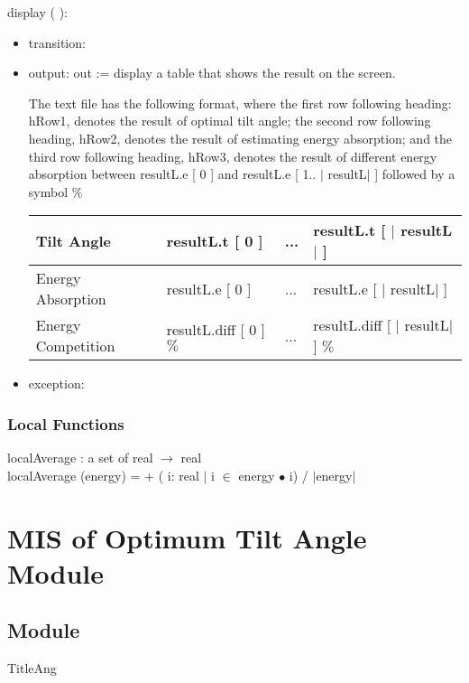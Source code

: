 \documentclass[12pt, titlepage]{article}
\begin{document}
\noindent  display ( ):
\begin{itemize}
\item transition:
\item output: out := display a table that shows the result on the screen.

The text file has the following format, where the first row following heading: hRow1, denotes the result of optimal tilt angle; the second row following heading, hRow2, denotes the result of estimating energy absorption; and the third row following heading, hRow3, denotes the result of different energy absorption between resultL.e [ 0 ] and resultL.e [ 1.. $|$ resultL$|$ ] followed by a symbol $\%$


\begin{center}
\begin{tabular}{p{4.5cm}|p{4cm}|p{1cm}|p{5cm}}

\hline 
Tilt Angle & resultL.t [ 0 ] & ...  & resultL.t [ $|$ resultL$|$ ] \\
\hline 
Energy Absorption & resultL.e [ 0 ] & ...  & resultL.e [ $|$ resultL$|$ ] \\
\hline 
Energy Competition & resultL.diff [ 0 ] $\%$    & ...     & resultL.diff [ $|$ resultL$|$ ] $\%$    \\
\hline
\end{tabular}
\end{center}

\item exception: 
\end{itemize}


\subsubsection{Local Functions}
localAverage : a set of real $\rightarrow$ real\\
localAverage (energy) =  + ( i: real $|$ i $\in$ energy $\bullet$  i) / $|$energy$|$\\



\section{MIS of Optimum Tilt Angle Module} \label{ModuleTA} 

\subsection{Module}
TitleAng
\end{document}
